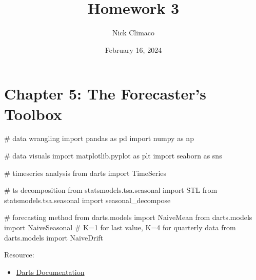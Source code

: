\documentclass[
  11pt,
]{article}
\title{Homework 3}
\author{Nick Climaco}
\date{February 16, 2024}
\newenvironment{Shaded}{\begin{snugshade}}{\end{snugshade}}
\newcommand{\CommentTok}[1]{\textcolor[rgb]{0.37,0.37,0.37}{#1}}
\newcommand{\ImportTok}[1]{\textcolor[rgb]{0.00,0.46,0.62}{#1}}
\newcommand{\NormalTok}[1]{\textcolor[rgb]{0.00,0.23,0.31}{#1}}
\providecommand{\tightlist}{%
  \setlength{\itemsep}{0pt}\setlength{\parskip}{0pt}}\usepackage{longtable,booktabs,array}
\renewcommand*\contentsname{Table of contents}
\newcommand\contentsname{Table of contents}
\begin{document}
\maketitle


\renewcommand*\contentsname{Table of contents}
{
\hypersetup{linkcolor=}
\setcounter{tocdepth}{3}
\tableofcontents
}
\newpage

\section{Chapter 5: The Forecaster's
Toolbox}\label{chapter-5-the-forecasters-toolbox}

\begin{Shaded}
\begin{Highlighting}[]
\CommentTok{\# data wrangling }
\ImportTok{import}\NormalTok{ pandas }\ImportTok{as}\NormalTok{ pd }
\ImportTok{import}\NormalTok{ numpy }\ImportTok{as}\NormalTok{ np}

\CommentTok{\# data visuals}
\ImportTok{import}\NormalTok{ matplotlib.pyplot }\ImportTok{as}\NormalTok{ plt }
\ImportTok{import}\NormalTok{ seaborn }\ImportTok{as}\NormalTok{ sns}

\CommentTok{\# timeseries analysis}
\ImportTok{from}\NormalTok{ darts }\ImportTok{import}\NormalTok{ TimeSeries}

\CommentTok{\# ts decomposition}
\ImportTok{from}\NormalTok{ statsmodels.tsa.seasonal }\ImportTok{import}\NormalTok{ STL}
\ImportTok{from}\NormalTok{ statsmodels.tsa.seasonal }\ImportTok{import}\NormalTok{ seasonal\_decompose}

\CommentTok{\# forecasting method}
\ImportTok{from}\NormalTok{ darts.models }\ImportTok{import}\NormalTok{ NaiveMean}
\ImportTok{from}\NormalTok{ darts.models }\ImportTok{import}\NormalTok{ NaiveSeasonal }\CommentTok{\# K=1 for last value, K=4 for quarterly data}
\ImportTok{from}\NormalTok{ darts.models }\ImportTok{import}\NormalTok{ NaiveDrift}
\end{Highlighting}
\end{Shaded}

Resource:

\begin{itemize}
\tightlist
\item
  \href{https://unit8co.github.io/darts/quickstart/00-quickstart.html}{Darts
  Documentation}
\end{itemize}
\end{document}
